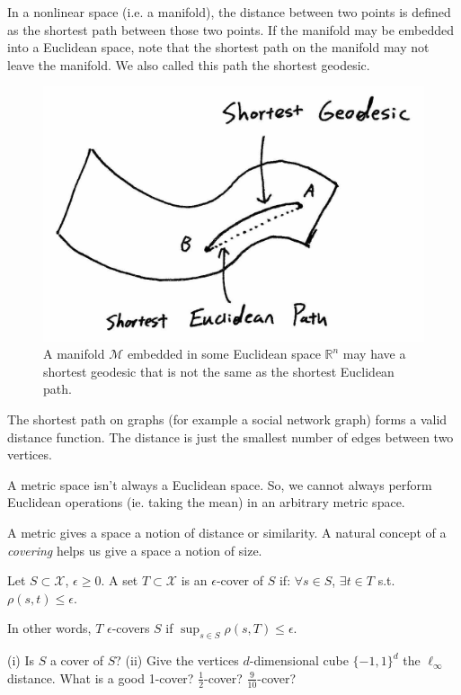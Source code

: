 \begin{example}[Geodesics] In a nonlinear space (i.e. a manifold),
the distance between two points is defined as the shortest path
between those two points. If the manifold may be embedded into a
Euclidean space, note that the shortest path on the manifold may
not leave the manifold. We also called this path the shortest 
geodesic.
\end{example}
\begin{figure}
    \centering
    \captionsetup{width=0.8\textwidth}
    \includegraphics[scale=0.15]{chapter_1/files/geodesic.jpg}
    \caption{A manifold $\mathcal{M}$ embedded in some Euclidean
    space $\mathbb{R}^n$ may have a shortest geodesic that is
    not the same as the shortest Euclidean path.}
    \label{fig:geodesic}
\end{figure}
\begin{example} The shortest path on graphs (for 
example a social network graph) forms a valid distance function. The
distance is just the smallest number of edges between two vertices.
\end{example}
\begin{remark}
A metric space isn't always a Euclidean space. So, we cannot always
perform Euclidean operations (ie. taking the mean) in an arbitrary
metric space.
\end{remark}

A metric gives a space a notion of distance or similarity. A natural
concept of a \emph{covering} helps us give a space a notion of size.

\begin{definition}[Cover]
Let $S \subset \mathcal{X}$, $\epsilon \geq 0$. A set $T \subset
\mathcal{X}$ is an $\epsilon$-cover of $S$ if:  $\forall s \in S$,
$\exists t \in T$ s.t. $\rho(s,t) \le \epsilon$.
\end{definition}

In other words, $T$ $\epsilon$-covers $S$ if $\sup_{s\in S} 
\rho(s,T)\leq \epsilon$.

\begin{exercise}
(i) Is $S$ a cover of $S$? (ii) Give the vertices $d$-dimensional
cube $\{-1,1\}^d$ the $\ell_\infty$ distance. What is a good 1-cover?
$\frac{1}{2}$-cover? $\frac{9}{10}$-cover?
\end{exercise}

